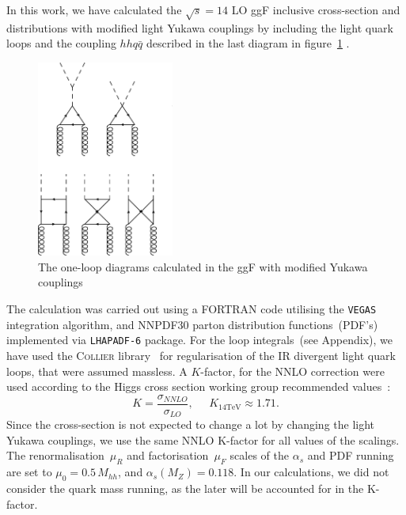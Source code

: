 %
\par
%
{}
In this work, we have calculated the  $ \sqrt{s} = 14$   LO ggF inclusive cross-section and distributions with modified light Yukawa couplings by including the light quark loops and the coupling $hh q \bar q$ described in the last diagram in figure~\ref{fig_ggf_diag} .
\begin{figure}[!htpb]
	\centering
	\includegraphics[width = 0.4\textwidth, angle =-90]{./figures/gg_hh_lo}
	\caption{The one-loop diagrams calculated in the ggF with modified Yukawa couplings}
	\label{fig_ggf_diag}
\end{figure}
The calculation was carried out using a FORTRAN code utilising the \texttt{VEGAS} integration algorithm, and NNPDF30 parton distribution functions~(PDF's)\cite{Ball:2017nwa} implemented via \texttt{LHAPADF-6} package\cite{Buckley:2014ana}. For the loop integrals~(see Appendix), we have used the \textsc{Collier} library~\cite{Denner:2014gla} for regularisation of the IR divergent light quark loops, that were assumed massless. A $K$-factor, for the NNLO correction were used according to the Higgs cross section working group recommended values~\cite{Dittmaier:2012vm,deFlorian:2016spz}:
\begin{equation}
	K = \frac{\sigma_{NNLO}}{\sigma_{LO}}, \;\;\;\;\; K_{14 \mathrm{TeV}} \approx 1.71.
\end{equation}
Since the cross-section is not expected to change a lot by changing the light Yukawa couplings, we use the same NNLO K-factor for all values of the scalings.
The renormalisation~$\mu_R$ and factorisation~$ \mu_F$ scales of the $\alpha_s$ and PDF running are set to $\mu_0 =0.5\, M_{hh}$, and $\alpha_s(M_Z) = 0.118$. In our calculations, we did not consider the quark mass running, as the later will be accounted for in the K-factor.
